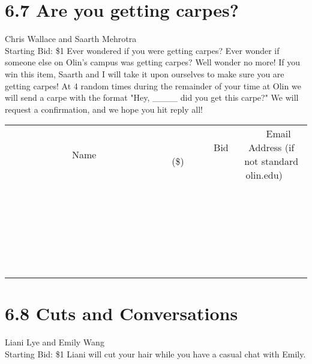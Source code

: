 \documentclass[11pt]{article}
\begin{document}
\section*{6.7 Are you getting carpes?}
Chris Wallace and Saarth Mehrotra
\\
Starting Bid: \$1
\newline
Ever wondered if you were getting carpes? Ever wonder if someone else on Olin's campus was getting carpes? Well wonder no more! If you win this item, Saarth and I will take it upon ourselves to make sure you are getting carpes! At 4 random times during the remainder of your time at Olin we will send a carpe with the format "Hey, \_\_\_\_ did you get this carpe?" We will request a confirmation, and we hope you hit reply all!
\\[6ex]
\begin{tabular}{c c c}
~~~~~~~~~~~~~Name~~~~~~~~~~~~~ & ~~~~~~~~~Bid (\$)~~~~~~~~~  & ~~~Email Address (if not standard olin.edu)~~~\\
 & & \\
\hline
 & & \\
\hline
 & & \\
\hline
 & & \\
\hline
 & & \\
\hline
 & & \\
\hline
 & & \\
\hline
 & & \\
\hline
 & & \\
\hline
 & & \\
\hline
 & & \\
\hline
 & & \\
\hline
 & & \\
\hline
 & & \\
\hline
 & & \\
\hline
 & & \\
\hline
 & & \\
\hline
 & & \\
\hline
 & & \\
\hline
 & & \\
\hline
 & & \\
\hline
 & & \\
\hline
 & & \\
\hline
 & & \\
\hline
 & & \\
\hline
 & & \\
\hline
\end{tabular}
\newpage
\section*{6.8 Cuts and Conversations}
Liani Lye and Emily Wang
\\
Starting Bid: \$1
\newline
Liani will cut your hair while you have a casual chat with Emily.
\end{document}
